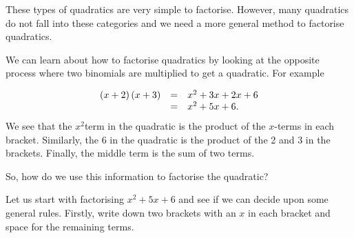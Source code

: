    
    
    \noindent
      \label{m39394*id275654}These types of quadratics are very simple to factorise. However, many quadratics do not fall into these categories and we need a more general method to factorise quadratics.
  \par 
      \label{m39394*id275684}We can learn about how to factorise quadratics by looking at the opposite process where two binomials are multiplied to get a quadratic. For example
        
    \begin{equation*}
    \begin{array}{ccl}\hfill \left(x+2\right)\left(x+3\right)& =& x^2+3x+2x+6 \\ & =& {x}^{2}+5x+6.\hfill \end{array}
      \end{equation*}
      \label{m39394*id275871}We see that the ${x}^{2}$\hspace{1ex}term in the quadratic is the product of the $x$-terms in each bracket. Similarly, the 6 in the quadratic is the product of the 2 and 3 in the brackets. Finally, the middle term is the sum of two terms.\par 
      \label{m39394*id275901}So, how do we use this information to factorise the quadratic?\par 
      \label{m39394*id275905}Let us start with factorising ${x}^{2}+5x+6$ \hspace{1ex}and see if we can decide upon some general rules. Firstly, write down two brackets with an $x$ in each bracket and space for the remaining terms.\par 
      \label{m39394*id275944}\nopagebreak\noindent{}
        
